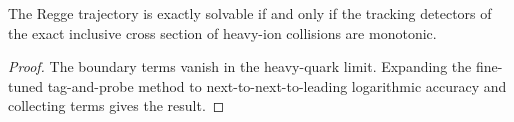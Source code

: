 \begin{proposition}\label{thm:2}
The Regge trajectory is exactly solvable if and only if the tracking
detectors of the exact inclusive cross section of heavy-ion collisions
are monotonic.
\end{proposition}

\begin{proof}
The boundary terms vanish in the heavy-quark limit. Expanding the
fine-tuned tag-and-probe method to next-to-next-to-leading logarithmic
accuracy and collecting terms gives the result.
\end{proof}

